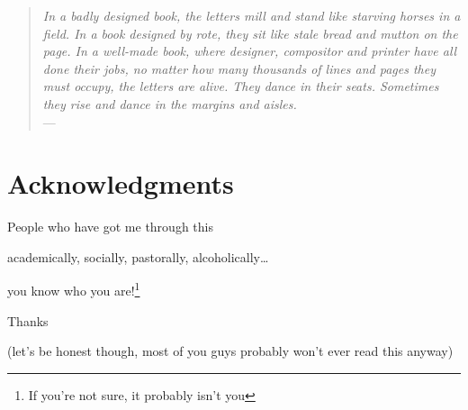 \cleardoublepage

\begin{quote}{\slshape    
    In a badly designed book, the letters mill 
    and stand like starving horses in a field.
    In a book designed by rote, they sit 
    like stale bread and mutton on the page. 
    In a well-made book, where designer, compositor
    and printer have all done their jobs, 
    no matter how many thousands of lines and pages 
    they must occupy, the letters are alive. 
    They dance in their seats. 
    Sometimes they rise and dance in the margins and aisles. } \\ \medskip
    ---  \citep{Bringhurst2008}
\end{quote}



\bigskip

\begingroup
\let\clearpage\relax
\let\cleardoublepage\relax
\let\cleardoublepage\relax
\chapter*{Acknowledgments}

\medskip

\begin{center}
 People who have got me through this
\end{center}

\medskip

\begin{center}
academically, socially, pastorally, alcoholically\ldots
\end{center}

\medskip

\begin{center}
you know who you are!\footnote{If you're not sure, it probably isn't you}
\end{center}

\medskip

\begin{center}
Thanks
\end{center}

\medskip

\begin{center}
(let's be honest though, most of you guys probably won't ever read this anyway)
\end{center}

\endgroup



